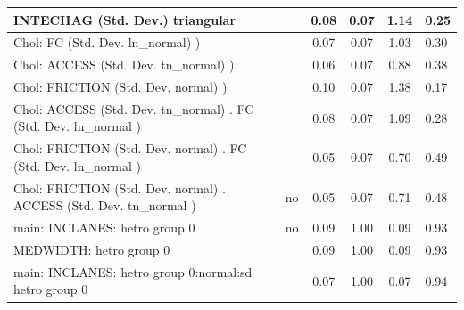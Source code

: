 \begin{table}
\begin{center}
\begin{tabular}{|l|l|c|c|c|l|}
			\hline
			INTECHAG (Std. Dev.) triangular &  & 0.08 & 0.07 & 1.14 & 0.25 \\
			\hline
			 Chol: FC (Std. Dev. ln_normal) ) &  & 0.07 & 0.07 & 1.03 & 0.30 \\
			\hline
			 Chol: ACCESS (Std. Dev. tn_normal) ) &  & 0.06 & 0.07 & 0.88 & 0.38 \\
			\hline
			 Chol: FRICTION (Std. Dev. normal) ) &  & 0.10 & 0.07 & 1.38 & 0.17 \\
			\hline
			 Chol: ACCESS (Std. Dev. tn_normal) . FC (Std. Dev.   ln_normal ) &  & 0.08 & 0.07 & 1.09 & 0.28 \\
			\hline
			 Chol: FRICTION (Std. Dev. normal) . FC (Std. Dev.   ln_normal ) &  & 0.05 & 0.07 & 0.70 & 0.49 \\
			\hline
			 Chol: FRICTION (Std. Dev. normal) . ACCESS (Std. Dev.   tn_normal ) & no & 0.05 & 0.07 & 0.71 & 0.48 \\
			\hline
			main: INCLANES: hetro group 0 & no & 0.09 & 1.00 & 0.09 & 0.93 \\
			\hline
			MEDWIDTH: hetro group 0 &  & 0.09 & 1.00 & 0.09 & 0.93 \\
			\hline
			main: INCLANES: hetro group 0:normal:sd  hetro group 0 &  & 0.07 & 1.00 & 0.07 & 0.94 \\
			\hline
		\end{tabular}
	\end{center}
\end{table}